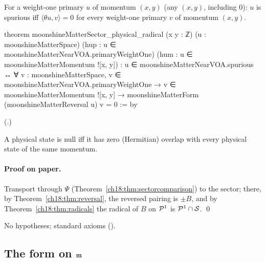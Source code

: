 \begin{theorem}\label{ch18:thm:rootradical}
For a weight-one primary $u$ of momentum $(x,y)$ (any $(x,y)$, including $0$): $u$ is spurious iff
$\langle\theta u,v\rangle=0$ for every weight-one primary $v$ of momentum $(x,y)$.
\end{theorem}
\begin{leancode}
theorem moonshineMatterSector_physical_radical (x y : ℤ) (u : moonshineMatterSpace)
    (hup : u ∈ moonshineMatterNearVOA.primaryWeightOne)
    (hum : u ∈ moonshineMatterMomentum ![x, y]) :
    u ∈ moonshineMatterNearVOA.spurious ↔
      ∀ v : moonshineMatterSpace, v ∈ moonshineMatterNearVOA.primaryWeightOne →
        v ∈ moonshineMatterMomentum ![x, y] →
          moonshineMatterForm (moonshineMatterReversal u) v = 0 := by
\end{leancode}
(.)
\begin{physics}A physical state is null iff it has zero (Hermitian) overlap with every physical state of the same momentum.\end{physics}
\paragraph{Proof on paper.}  Transport through $\Psi$ (Theorem~\ref{ch18:thm:sectorcomparison}) to the sector; there, by
Theorem~\ref{ch18:thm:reversal}, the reversed pairing is $\pm B$, and by Theorem~\ref{ch18:thm:radicals} the radical of $B$ on
$\mathcal{P}^1$ is $\mathcal{P}^1\cap\mathcal{S}$. \qed
\begin{status}No hypotheses; standard axioms ().\end{status}

\subsection{\texorpdfstring{The form on $\mathfrak{m}$}{The form on m}}

